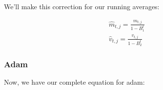             We'll make this correction for our running averages:

            \begin{equation}
                \begin{gathered}
                    \widehat{m}_{t,j} = \frac{m_{t,j}}{1-B_1^t} \\
                    \widehat{v}_{t,j} = \frac{v_{t,j}}{1-B_2^t}
                \end{gathered}
            \end{equation}

        \phantom{}

        \subsubsection{Adam}

            Now, we have our complete equation for adam:\\

